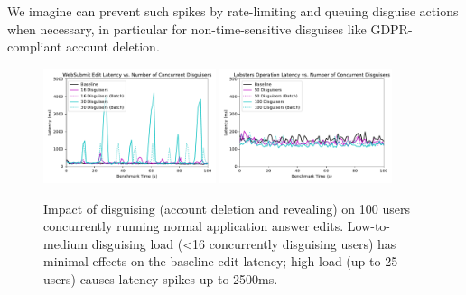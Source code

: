 We imagine \sys can prevent such spikes by rate-limiting and queuing disguise actions when
necessary, in particular for non-time-sensitive disguises like GDPR-compliant account deletion.


\begin{figure}[t!]
    \centering
        \includegraphics[width=0.45\textwidth]{figs/websubmit_concurrent_results_20lec_100users}
        \includegraphics[width=0.45\textwidth]{figs/lobsters_concurrent_results}
    \caption{Impact of disguising (account deletion and revealing) on 100 users concurrently running
    normal application answer edits. Low-to-medium disguising load (<16 concurrently disguising users) has
    minimal effects on the baseline edit latency; high load (up to 25 users) causes latency spikes
    up to 2500ms.} 
    \label{fig:concurrent}
\end{figure}
